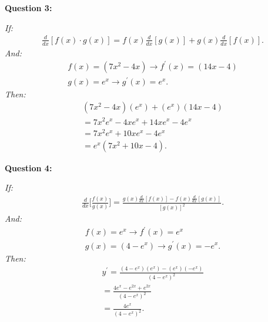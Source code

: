 \documentclass{report}
\begin{document}
    \bigbreak \noindent \bigbreak \noindent 
    \begin{Large}
        \textbf{Question 3:}
    \end{Large}
    \bigbreak \noindent 
    \bigbreak \noindent 
    \textit{If:}
    \begin{align*}
        \frac{d}{dx}[f(x) \cdot g(x)] = f(x) \frac{d}{dx}[g(x)] + g(x) \frac{d}{dx}[f(x)]
    .\end{align*}
    \bigbreak \noindent 
    \textit{And:}
    \begin{align*}
        f(x) = (7x^2-4x) \longrightarrow f ^{\prime}(x) = (14x-4) \\
        g(x) = e^x \longrightarrow g ^{\prime}(x) = e^x
    .\end{align*}
    \bigbreak \noindent 
    \textit{Then:}
    \begin{align*}
        (7x^2-4x)(e^x) + (e^x)(14x-4)  \\ 
        = 7x^2e^x-4xe^x+14xe^x-4e^x \\ 
        = 7x^2e^x+10xe^x-4e^x \\ 
        = e^x(7x^2+10x-4)
    .\end{align*}
    \bigbreak \noindent \bigbreak \noindent 
    \begin{Large}
        \textbf{Question 4:}
    \end{Large}
    \bigbreak \noindent 
    \bigbreak \noindent 
    \textit{If:}
    \begin{align*}
        \frac{d}{dx}\bigg[ \frac{f(x)}{g(x)}\bigg] = \frac{g(x) \frac{d}{dx}[f(x)] - f(x) \frac{d}{dx}[g(x)]}{[g(x)]^2}
    .\end{align*}
    \bigbreak \noindent 
    \textit{And:}
    \begin{align*}
        f(x) = e^x \longrightarrow f ^{\prime}(x) = e^x \\ 
        g(x) = (4-e^x) \longrightarrow g ^{\prime}(x) = -e^x
    .\end{align*}
    \bigbreak \noindent 
    \textit{Then:}
    \begin{align*}
        y ^{\prime} = \frac{(4-e^x)(e^x) - (e^x)(-e^x)}{(4-e^x)^2} \\
        = \frac{4e^x - e^{2x} + e^{2x}}{(4-e^x)^2} \\ 
        = \frac{4e^x}{(4-e^x)^2}
    .\end{align*}
\end{document}
